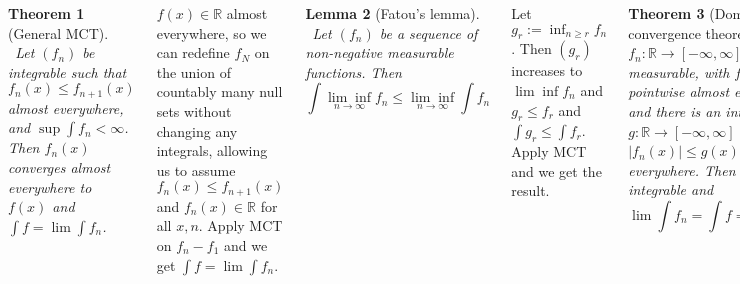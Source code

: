 \documentclass{tikzposter} %
\newtheorem{theorem}{Theorem}
\newtheorem{lemma}[theorem]{Lemma}
\begin{document}
\begin{columns}
{    \begin{theorem}[General MCT]
    \ Let $(f_{n})$ be integrable such that $f_{n}(x) \le f_{n+1}(x)$ almost everywhere, and $\sup \int f_{n} < \infty$. Then $f_{n}(x)$ converges almost everywhere to $f(x)$ and $\int f = \lim \int f_{n}$.
    \end{theorem}
    \hphantom{}

    $f(x) \in \mathbb{R}$ almost everywhere, so we can redefine $f_{N}$ on the union of countably many null sets without changing any integrals, allowing us to assume $f_{n}(x) \le f_{n+1}(x)$ and $f_{n}(x) \in \mathbb{R}$ for all $x, n$. Apply MCT on $f_{n} - f_{1}$ and we get $\int f = \lim \int f_{n}$. \\

    \begin{lemma}[Fatou's lemma]
      \ Let $(f_{n})$ be a sequence of non-negative measurable functions. Then
      \[
        \int \underset{n \to \infty}{\lim \inf} f_{n} \le \underset{n \to \infty}{\lim \inf} \int f_{n}
      \]
    \end{lemma}
    \hphantom{}

    Let $g_{r} := \inf_{n \ge r} f_{n}$. Then $(g_{r})$ increases to $\lim\inf f_{n}$ and $g_{r} \le f_{r}$ and $\int g_{r} \le \int f_{r}$. Apply MCT and we get the result. \\

    \begin{theorem}[Dominated convergence theorem]
      \ Let $f_{n} : \mathbb{R} \to [-\infty, \infty]$ be measurable, with $f_{n} \to f$ pointwise almost everywhere, and there is an integrable $g : \mathbb{R} \to [-\infty, \infty]$ such that $|f_{n}(x)| \le g(x)$ almost everywhere. Then $f$ is integrable and
      \[
        \lim \int f_{n} = \int f = \int \lim f_{n}
      \]
    \end{theorem}
    \hphantom{}

    Proof by applying Fatou's lemma to $g + f_{n}$ and $g - f_{n}$ to obtain $\int (g+f) \le \int g + \lim \inf \int f_{n}$ and $\int (g - f) \le \int g - \lim\sup \int f_{n}$. \\

    \begin{theorem}[Bounded convergence theorem]
      \ Let $I$ be a bounded interval, $(f_{n})$ a sequence in $\mathcal{L}^{1}(I)$ converging almost everywhere to $f$, and suppose that there is a constant $c$ such that $|f_{n}(x)| \le c$ almost everywhere for all $n$. Then $f \in \mathcal{L}^{1}(I)$, and $\int_{I} f = \lim \int_{I} f_{n}$.
    \end{theorem}
    \hphantom{}

}
\end{columns}
\end{document}
